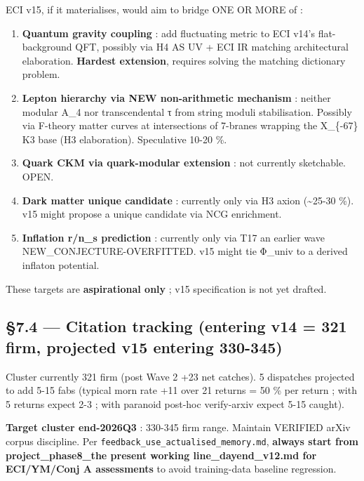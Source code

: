 \documentclass[
  11pt,
  a4paper,
]{article}
\begin{document}
ECI v15, if it materialises, would aim to bridge ONE OR MORE of :

\begin{enumerate}
\def\labelenumi{(\alph{enumi})}
\item
  \textbf{Quantum gravity coupling} : add fluctuating metric to ECI v14's flat-background QFT, possibly via H4 AS UV + ECI IR matching architectural elaboration. \textbf{Hardest extension}, requires solving the matching dictionary problem.
\item
  \textbf{Lepton hierarchy via NEW non-arithmetic mechanism} : neither modular A\_4 nor transcendental τ from string moduli stabilisation. Possibly via F-theory matter curves at intersections of 7-branes wrapping the X\_\{-67\} K3 base (H3 elaboration). Speculative 10-20 \%.
\item
  \textbf{Quark CKM via quark-modular extension} : not currently sketchable. OPEN.
\item
  \textbf{Dark matter unique candidate} : currently only via H3 axion (\textasciitilde25-30 \%). v15 might propose a unique candidate via NCG enrichment.
\item
  \textbf{Inflation r/n\_s prediction} : currently only via T17 an earlier wave NEW\_CONJECTURE-OVERFITTED. v15 might tie Φ\_univ to a derived inflaton potential.
\end{enumerate}

These targets are \textbf{aspirational only} ; v15 specification is not yet drafted.

\hypertarget{cluster-delta-tracking-entering-v14-321-firm-projected-v15-entering-330-345}{%
\subsection{§7.4 --- Citation tracking (entering v14 = 321 firm, projected v15 entering 330-345)}\label{cluster-delta-tracking-entering-v14-321-firm-projected-v15-entering-330-345}}

Cluster currently 321 firm (post Wave 2 +23 net catches). 5 dispatches projected to add 5-15 fabs (typical morn rate +11 over 21 returns = 50 \% per return ; with 5 returns expect 2-3 ; with paranoid post-hoc verify-arxiv expect 5-15 caught).

\textbf{Target cluster end-2026Q3} : 330-345 firm range. Maintain VERIFIED arXiv corpus discipline. Per \texttt{feedback\_use\_actualised\_memory.md}, \textbf{always start from project\_phase8\_the present working line\_dayend\_v12.md for ECI/YM/Conj A assessments} to avoid training-data baseline regression.
\end{document}
